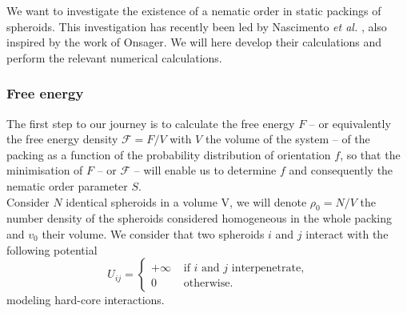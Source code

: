 \documentclass[class=article, float=false, crop=false]{standalone}
\begin{document}
We want to investigate the existence of a nematic order in static packings of spheroids. This investigation has recently been led by Nascimento \textit{et al.} \cite{nascimento2017density}, also inspired by the work of Onsager. We will here develop their calculations and perform the relevant numerical calculations.

\subsubsection{Free energy}

The first step to our journey is to calculate the free energy $F$ -- or equivalently the free energy density $\mathcal{F}=F/V$ with $V$ the volume of the system -- of the packing as a function of the probability distribution of orientation $f$, so that the minimisation of $F$ -- or $\mathcal{F}$ -- will enable us to determine $f$ and consequently the nematic order parameter $S$.\\

Consider $N$ identical spheroids in a volume V, we will denote $\rho_0=N/V$ the number density of the spheroids considered homogeneous in the whole packing and $v_0$ their volume. We consider that two spheroids $i$ and $j$ interact with the following potential
\begin{equation}
U_{ij} = \begin{cases} +\infty &\text{ if } i \text{ and } j \text{ interpenetrate,} \\ 0 & \text{ otherwise.}\end{cases}
\label{interacting_potential}
\end{equation}
modeling hard-core interactions.\\

\end{document}
